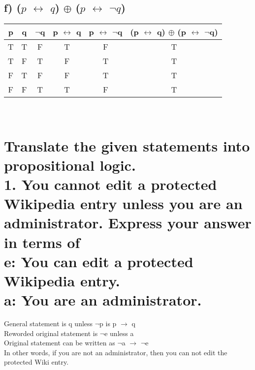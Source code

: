 \documentclass[11pt, oneside]{article} %
\numberwithin{equation}{section} %
\numberwithin{figure}{section} %
\numberwithin{table}{section} %
\begin{document}
\begin{table}[!htp]
\subsection{f) ($p$ $\leftrightarrow$ $q$) $\oplus$ ($p$ $\leftrightarrow$ $\neg$$q$)}
\begin{tabular}{c c c c c c}
\hline\hline
p & q & $\neg$q & p $\leftrightarrow$ q & p $\leftrightarrow$ $\neg$q & (p $\leftrightarrow$ q) $\oplus$ (p $\leftrightarrow$ $\neg$q) \\ [0.5ex] %
\hline
T & T & F & T & F & T\\
T & F & T & F & T & T\\
F & T & F  & F & T & T\\
F & F & T & T & F & T\\ [1ex]
\hline
\end{tabular}
\label{table:nonlin}
\end{table}

\section{ \\
Translate the given statements into propositional logic.\\
1. You cannot edit a protected Wikipedia entry unless you are an administrator. Express your answer in terms of \\
e: You can edit a protected Wikipedia entry.\\
a: You are an administrator.} 
General statement is q unless $\neg$p is p $\rightarrow$ q \\
Reworded original statement is $\neg$e unless a \\
Original statement can be written as $\neg$a  $\rightarrow$ $\neg$e \\
In other words, if you are not an administrator, then you can not edit the protected Wiki entry.

\end{document}
